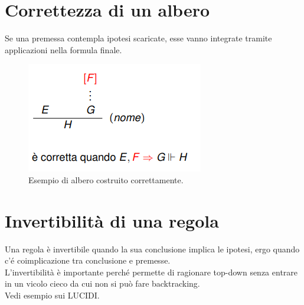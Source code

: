\documentclass[12pt]{article}
\begin{document}
\section{Correttezza di un albero}
Se una premessa contempla ipotesi scaricate, esse vanno integrate tramite applicazioni nella formula finale. 
\begin{figure}[!htb]
    \centering
    \includegraphics[width=.9\linewidth,height=.40\textheight,keepaspectratio]{brutta/ipotesi_globali_formula_finale.png} %
    \begin{center}
        \caption{\label{fig:correttezza_albero}Esempio di albero costruito correttamente.} %
    \end{center}
\end{figure}
\section{Invertibilità di una regola}
Una regola è invertibile quando la sua conclusione implica le ipotesi, ergo quando c'é coimplicazione tra conclusione e premesse.\\
L'invertibilità è importante perché permette di ragionare top-down senza entrare in un vicolo cieco da cui non si può fare backtracking.\\
Vedi esempio sui LUCIDI.
\end{document}
